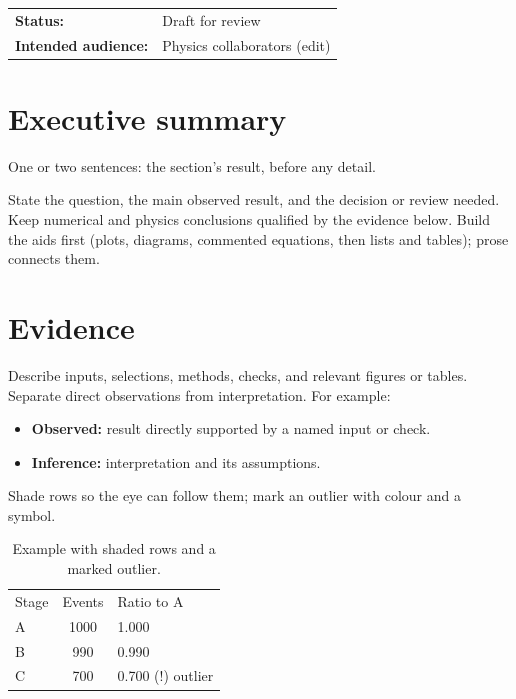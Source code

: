 \documentclass[11pt,a4paper]{article}
\title{\ReportTitle}
\author{\ReportAuthor}
\date{\ReportDate}
\newcommand{\ReportStatus}{Draft for review}
\begin{document}
\maketitle

\begin{center}
  \begin{tabular}{ll}
    \textbf{Status:} & \ReportStatus \\
    \textbf{Intended audience:} & Physics collaborators (edit) \\
  \end{tabular}
\end{center}

\section{Executive summary}

\begin{headline}
  One or two sentences: the section's result, before any detail.
\end{headline}

State the question, the main observed result, and the decision or review needed. Keep
numerical and physics conclusions qualified by the evidence below. Build the aids first
(plots, diagrams, commented equations, then lists and tables); prose connects them.

\section{Evidence}

Describe inputs, selections, methods, checks, and relevant figures or tables. Separate
direct observations from interpretation. For example:

\begin{itemize}
  \item \textbf{Observed:} result directly supported by a named input or check.
  \item \textbf{Inference:} interpretation and its assumptions.
\end{itemize}

Shade rows so the eye can follow them; mark an outlier with colour and a symbol.

\begin{table}[ht]
  \centering
  \caption{Example with shaded rows and a marked outlier.}
  \label{tab:example}
  \begin{tabular}{lS[table-format=4.0]l}
    Stage & {Events} & Ratio to A                                  \\
    A     & 1000     & \num{1.000}                                 \\
    B     & 990      & \num{0.990}                                 \\
    C     & 700      & \textcolor{ctpRed}{\num{0.700} (!) outlier} \\
  \end{tabular}
\end{table}
\end{document}
